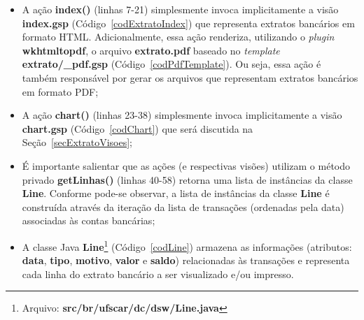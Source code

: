 \vspace{0.5cm}

\begin{itemize}

\item A  ação {\bf index()}  (linhas 7-21) simplesmente invoca  implicitamente a
  visão {\bf  index.gsp} (Código~\ref{codExtratoIndex}) que  representa extratos
  bancários em formato HTML.   Adicionalmente, essa ação renderiza, utilizando o
  {\it plugin}  {\bf wkhtmltopdf}, o  arquivo {\bf extrato.pdf} baseado  no {\it
    template}  {\bf extrato/\_pdf.gsp} (Código~\ref{codPdfTemplate}).   Ou seja,
  essa ação é também responsável  por gerar os arquivos que representam extratos
  bancários em formato PDF; 

\vspace{0.5cm}

\item A ação  {\bf chart()} (linhas 23-38) simplesmente  invoca implicitamente a
  visão   {\bf  chart.gsp}   (Código~\ref{codChart})  que   será   discutida  na
  Seção~\ref{secExtratoVisoes};

\vspace{0.5cm} 

\item  É importante salientar  que as  ações (e  respectivas visões)  utilizam o
  método  privado  {\bf  getLinhas()}   (linhas  40-58)  retorna  uma  lista  de
  instâncias  da classe  {\bf  Line}.   Conforme pode-se  observar,  a lista  de
  instâncias da classe  {\bf Line} é construída através da  iteração da lista de
  transações (ordenadas pela data) associadas às contas bancárias; 

\vspace{0.5cm}

\item      A     classe      Java     {\bf      Line}\footnote{Arquivo:     {\bf
    src/br/ufscar/dc/dsw/Line.java}}    (Código~\ref{codLine})    armazena    as
  informações (atributos:  {\bf data}, {\bf  tipo}, {\bf motivo}, {\bf  valor} e
  {\bf saldo})  relacionadas às  transações e representa  cada linha  do extrato
  bancário a ser visualizado e/ou impresso.  

\end{itemize}

\vspace{0.5cm}

